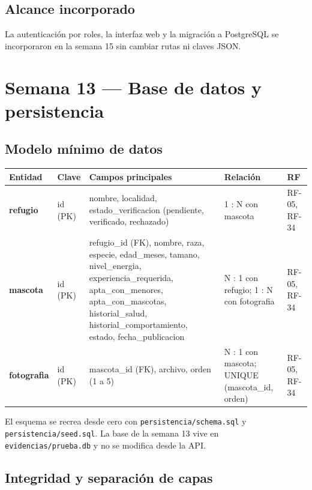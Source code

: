 \documentclass[11pt,a4paper]{article}
\newcommand{\code}[1]{\texttt{#1}}
\newcommand{\thead}[1]{\textbf{#1}}
\begin{document}
\subsection{Alcance incorporado}

La autenticación por roles, la interfaz web y la migración a PostgreSQL se
incorporaron en la semana 15 sin cambiar rutas ni claves JSON.

\clearpage

\section{Semana 13 --- Base de datos y persistencia}

\subsection{Modelo mínimo de datos}

{\footnotesize
\begin{tabularx}{\linewidth}{@{}V{0.55}V{0.55}V{1.95}V{1.0}V{0.95}@{}}
\toprule
\thead{Entidad} & \thead{Clave} & \thead{Campos principales} & \thead{Relación} & \thead{RF} \\ \midrule
\textbf{refugio} & id (PK) & nombre, localidad, estado\_verificacion
(pendiente, verificado, rechazado) & 1 : N con mascota & RF-05, RF-34 \\
\textbf{mascota} & id (PK) & refugio\_id (FK), nombre, raza, especie,
edad\_meses, tamano, nivel\_energia, experiencia\_requerida,
apta\_con\_menores, apta\_con\_mascotas, historial\_salud,
historial\_comportamiento, estado, fecha\_publicacion &
N : 1 con refugio; 1 : N con fotografia & RF-05, RF-34 \\
\textbf{fotografia} & id (PK) & mascota\_id (FK), archivo, orden (1 a 5) &
N : 1 con mascota; UNIQUE (mascota\_id, orden) & RF-05, RF-34 \\
\bottomrule
\end{tabularx}
}

El esquema se recrea desde cero con \code{persistencia/schema.sql} y
\code{persistencia/seed.sql}. La base de la semana 13 vive en
\code{evidencias/prueba.db} y no se modifica desde la API.

\subsection{Integridad y separación de capas}
\end{document}
